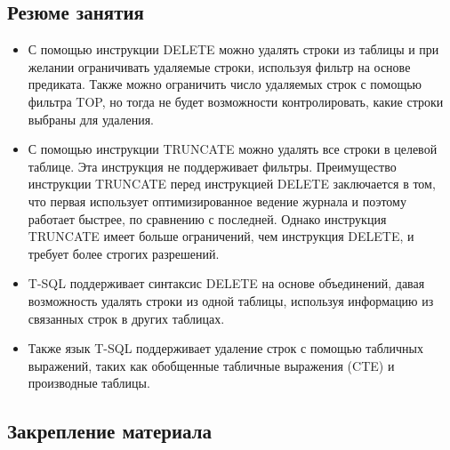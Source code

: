 \subsection*{Резюме занятия}
\begin{itemize}
	\item С помощью инструкции DELETE можно удалять строки из таблицы и при желании
	ограничивать удаляемые строки, используя фильтр на основе предиката. Также
	можно ограничить число удаляемых строк с помощью фильтра TOP, но тогда не
	будет возможности контролировать, какие строки выбраны для удаления. 
	\item С помощью инструкции TRUNCATE можно удалять все строки в целевой таблице.
	Эта инструкция не поддерживает фильтры. Преимущество инструкции TRUNCATE
	перед инструкцией DELETE заключается в том, что первая использует оптимизированное ведение журнала и поэтому работает быстрее, по сравнению с последней. Однако инструкция TRUNCATE имеет больше ограничений, чем инструкция
	DELETE, и требует более строгих разрешений. 
	\item T-SQL поддерживает синтаксис DELETE на основе объединений, давая возможность удалять строки из одной таблицы, используя информацию из связанных
	строк в других таблицах. 
	\item Также язык T-SQL поддерживает удаление строк с помощью табличных выражений, таких как обобщенные табличные выражения (CTE) и производные таблицы. 
\end{itemize}


\subsection*{Закрепление материала}


